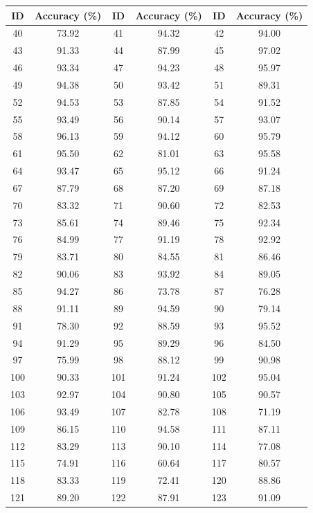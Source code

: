 \documentclass{article}
\begin{document}
\begin{table}[H]
\centering
\begin{tabular*}{\textwidth}{@{\extracolsep{\fill}}cccccc}
\toprule
\textbf{ID} & \textbf{Accuracy (\%)} & \textbf{ID} & \textbf{Accuracy (\%)} & \textbf{ID} & \textbf{Accuracy (\%)} \\
\midrule
    40 & 73.92 & 41 & 94.32 & 42 & 94.00 \\
43 & 91.33 & 44 & 87.99 & 45 & 97.02 \\
46 & 93.34 & 47 & 94.23 & 48 & 95.97 \\
49 & 94.38 & 50 & 93.42 & 51 & 89.31 \\
52 & 94.53 & 53 & 87.85 & 54 & 91.52 \\
55 & 93.49 & 56 & 90.14 & 57 & 93.07 \\
58 & 96.13 & 59 & 94.12 & 60 & 95.79 \\
61 & 95.50 & 62 & 81.01 & 63 & 95.58 \\
64 & 93.47 & 65 & 95.12 & 66 & 91.24 \\
67 & 87.79 & 68 & 87.20 & 69 & 87.18 \\
70 & 83.32 & 71 & 90.60 & 72 & 82.53 \\
73 & 85.61 & 74 & 89.46 & 75 & 92.34 \\
76 & 84.99 & 77 & 91.19 & 78 & 92.92 \\
79 & 83.71 & 80 & 84.55 & 81 & 86.46 \\
82 & 90.06 & 83 & 93.92 & 84 & 89.05 \\
85 & 94.27 & 86 & 73.78 & 87 & 76.28 \\
88 & 91.11 & 89 & 94.59 & 90 & 79.14 \\
91 & 78.30 & 92 & 88.59 & 93 & 95.52 \\
94 & 91.29 & 95 & 89.29 & 96 & 84.50 \\
97 & 75.99 & 98 & 88.12 & 99 & 90.98 \\
100 & 90.33 & 101 & 91.24 & 102 & 95.04 \\
103 & 92.97 & 104 & 90.80 & 105 & 90.57 \\
106 & 93.49 & 107 & 82.78 & 108 & 71.19 \\
109 & 86.15 & 110 & 94.58 & 111 & 87.11 \\
112 & 83.29 & 113 & 90.10 & 114 & 77.08 \\
115 & 74.91 & 116 & 60.64 & 117 & 80.57 \\
118 & 83.33 & 119 & 72.41 & 120 & 88.86 \\
121 & 89.20 & 122 & 87.91 & 123 & 91.09 \\

\end{tabular*}
\end{table}
\end{document}
